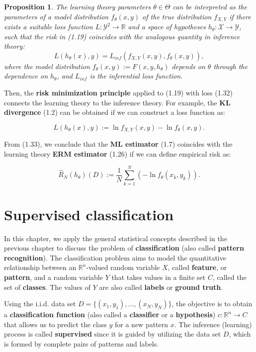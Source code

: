 \documentclass{report}
\newtheorem{proposition}{Proposition}[chapter]
\begin{document}
\begin{proposition}
The learning theory parameters $\theta \in \Theta$ can be interpreted as the parameters of a model distribution $f_\theta(x,y)$ of the true distribution $f_{X,Y}$ if there exists a suitable loss function $L : \mathcal{Y}^2 \to \mathbb{R}$ and a space of hypotheses $h_\theta: \mathcal{X} \to \mathcal{Y}$, such that the risk in (1.19) coincides with the analogous quantity in inference theory:
\begin{equation}
L(h_\theta(x), y) = L_{inf}(f_{X,Y}(x,y),f_\theta(x,y)),
\end{equation}
where the model distribution $f_\theta(x,y) := F(x,y,h_\theta)$ depends on $\theta$ through the dependence on $h_\theta$, and $L_{inf}$ is the inferential loss function.
\end{proposition}

Then, the \textbf{risk minimization principle} applied to (1.19) with loss (1.32) connects the learning theory to the inference theory. For example, the \textbf{KL divergence} (1.2) can be obtained if we can construct a loss function as:

\begin{equation}
L(h_\theta(x), y) := \ln f_{X,Y}(x,y) -\ln f_\theta(x,y).
\end{equation}

From (1.33), we conclude that the \textbf{ML estimator} (1.7) coincides with the learning theory \textbf{ERM estimator} (1.26) if we can define empirical risk as:

\begin{equation}
\hat{R}_N(h_\theta)(D) := \frac{1}{N}\sum_{k=1}^N (-\ln f_\theta(x_k,y_k)).
\end{equation}

\chapter{Supervised classification}
In this chapter, we apply the general statistical concepts described in the previous chapter to discuss the problem of \textbf{classification} (also called \textbf{pattern recognition}). The classification problem aims to model the quantitative relationship between an $\mathbb{R}^n$-valued random variable $X$, called \textbf{feature}, or \textbf{pattern}, and a random variable $Y$ that takes values in a finite set $C$, called the set of \textbf{classes}. The values of $Y$ are also called \textbf{labels} or \textbf{ground truth}.

Using the i.i.d. data set $D = \{(x_1,y_1),\dots,(x_N,y_N)\}$, the objective is to obtain a \textbf{classification function} (also called a \textbf{classifier} or a \textbf{hypothesis}) $c : \mathbb{R}^n \to C$ that allows us to predict the class $y$ for a new pattern $x$. The inference (learning) process is called \textbf{supervised} since it is guided by utilizing the data set $D$, which is formed by complete pairs of patterns and labels.
\end{document}
